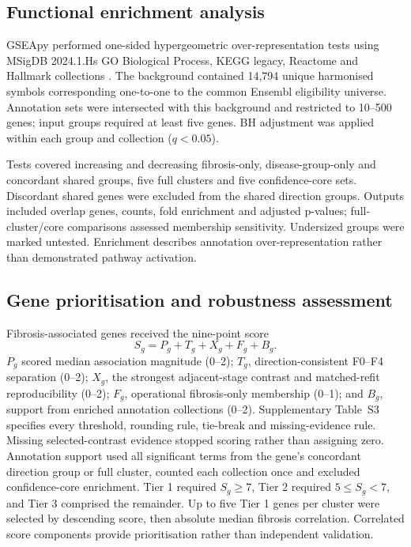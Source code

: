 \documentclass[11pt,a4paper]{article}
\begin{document}
\subsection*{Functional enrichment analysis}
GSEApy \cite{ref13} performed one-sided hypergeometric over-representation tests using MSigDB 2024.1.Hs GO Biological Process, KEGG legacy, Reactome and Hallmark collections \cite{ref12}. The background contained 14,794 unique harmonised symbols corresponding one-to-one to the common Ensembl eligibility universe. Annotation sets were intersected with this background and restricted to 10--500 genes; input groups required at least five genes. BH adjustment was applied within each group and collection ($q<0.05$).

Tests covered increasing and decreasing fibrosis-only, disease-group-only and concordant shared groups, five full clusters and five confidence-core sets. Discordant shared genes were excluded from the shared direction groups. Outputs included overlap genes, counts, fold enrichment and adjusted p-values; full-cluster/core comparisons assessed membership sensitivity. Undersized groups were marked untested. Enrichment describes annotation over-representation rather than demonstrated pathway activation.

\subsection*{Gene prioritisation and robustness assessment}
Fibrosis-associated genes received the nine-point score
\[
S_g=P_g+T_g+X_g+F_g+B_g.
\]
$P_g$ scored median association magnitude (0--2); $T_g$, direction-consistent F0--F4 separation (0--2); $X_g$, the strongest adjacent-stage contrast and matched-refit reproducibility (0--2); $F_g$, operational fibrosis-only membership (0--1); and $B_g$, support from enriched annotation collections (0--2). Supplementary Table~S3 specifies every threshold, rounding rule, tie-break and missing-evidence rule. Missing selected-contrast evidence stopped scoring rather than assigning zero. Annotation support used all significant terms from the gene's concordant direction group or full cluster, counted each collection once and excluded confidence-core enrichment. Tier 1 required $S_g\geq7$, Tier 2 required $5\leq S_g<7$, and Tier 3 comprised the remainder. Up to five Tier 1 genes per cluster were selected by descending score, then absolute median fibrosis correlation. Correlated score components provide prioritisation rather than independent validation.
\end{document}
